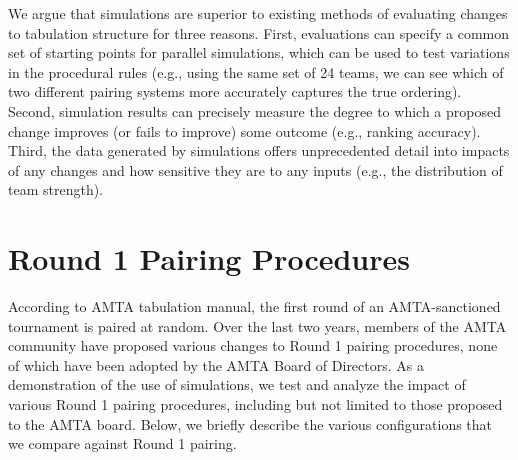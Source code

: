 \documentclass{tufte-handout}
\begin{document}
We argue that simulations are superior to existing methods of evaluating changes to tabulation structure for three reasons. First, evaluations can specify a common set of starting points for parallel simulations, which can be used to test variations in the procedural rules (e.g., using the same set of 24 teams, we can see which of two different pairing systems more accurately captures the true ordering). Second, simulation results can precisely measure the degree to which a proposed change improves (or fails to improve) some outcome (e.g., ranking accuracy). Third, the data generated by simulations offers unprecedented detail into impacts of any changes and how sensitive they are to any inputs (e.g., the distribution of team strength). 

\section{Round 1 Pairing Procedures}

According to AMTA tabulation manual, the first round of an AMTA-sanctioned tournament is paired at random. Over the last two years, members of the AMTA community have proposed various changes to Round 1 pairing procedures, none of which have been adopted by the AMTA Board of Directors. As a demonstration of the use of simulations, we test and analyze the impact of various Round 1 pairing procedures, including but not limited to those proposed to the AMTA board. Below, we briefly describe the various configurations that we compare against Round 1 pairing.
\end{document}
